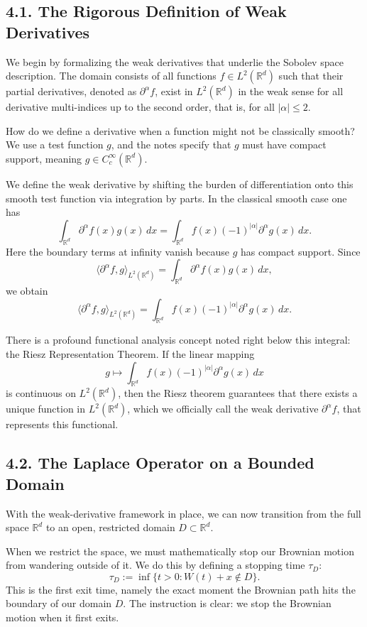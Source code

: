 \documentclass[11pt]{article}
\theoremstyle{definition}
\theoremstyle{remark}
\begin{document}
\subsection*{4.1. The Rigorous Definition of Weak Derivatives}
We begin by formalizing the weak derivatives that underlie the Sobolev space description. The domain consists of all functions \(f\in L^2(\mathbb R^d)\) such that their partial derivatives, denoted as \(\partial^\alpha f\), exist in \(L^2(\mathbb R^d)\) in the weak sense for all derivative multi-indices up to the second order, that is, for all \(|\alpha|\le 2\).

How do we define a derivative when a function might not be classically smooth? We use a test function \(g\), and the notes specify that \(g\) must have compact support, meaning \(g\in C_c^\infty(\mathbb R^d)\).

We define the weak derivative by shifting the burden of differentiation onto this smooth test function via integration by parts. In the classical smooth case one has
\[
\int_{\mathbb R^d} \partial^\alpha f(x)g(x)\,dx
=
\int_{\mathbb R^d} f(x)(-1)^{|\alpha|}\partial^\alpha g(x)\,dx.
\]
Here the boundary terms at infinity vanish because \(g\) has compact support. Since
\[
\langle \partial^\alpha f,g\rangle_{L^2(\mathbb R^d)}
=
\int_{\mathbb R^d} \partial^\alpha f(x)g(x)\,dx,
\]
we obtain
\[
\langle \partial^\alpha f,g\rangle_{L^2(\mathbb R^d)}
=
\int_{\mathbb R^d} f(x)(-1)^{|\alpha|}\partial^\alpha g(x)\,dx.
\]

There is a profound functional analysis concept noted right below this integral: the Riesz Representation Theorem. If the linear mapping
\[
g\mapsto \int_{\mathbb R^d} f(x)(-1)^{|\alpha|}\partial^\alpha g(x)\,dx
\]
is continuous on \(L^2(\mathbb R^d)\), then the Riesz theorem guarantees that there exists a unique function in \(L^2(\mathbb R^d)\), which we officially call the weak derivative \(\partial^\alpha f\), that represents this functional.

\subsection*{4.2. The Laplace Operator on a Bounded Domain}
With the weak-derivative framework in place, we can now transition from the full space \(\mathbb R^d\) to an open, restricted domain \(D\subset \mathbb R^d\).

When we restrict the space, we must mathematically stop our Brownian motion from wandering outside of it. We do this by defining a stopping time \(\tau_D\):
\[
\tau_D
:=
\inf\{t>0:W(t)+x\notin D\}.
\]
This is the first exit time, namely the exact moment the Brownian path hits the boundary of our domain \(D\). The instruction is clear: we stop the Brownian motion when it first exits.
\end{document}
